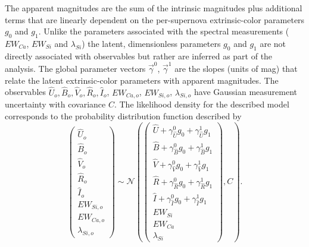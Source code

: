 \documentclass[trackchanges]{aastex61}   	%
\begin{document}
The apparent magnitudes are the sum of the intrinsic magnitudes plus additional terms that are linearly dependent on the
per-supernova
extrinsic-color parameters $g_0$ and $g_1$.  
Unlike the parameters associated with
the spectral measurements ($EW_{Ca}$, $EW_{Si}$ and $\lambda_{Si}$)  the latent,
dimensionless
parameters $g_0$ and $g_1$ are not directly associated
with observables but rather are inferred as part of the analysis.
The global parameter vectors $\vec{\gamma}^0$, $\vec{\gamma}^1$  are the slopes (units of mag) that relate 
the latent extrinsic-color parameters with apparent magnitudes.
The observables
$\hat{U}_o, {\hat{B}}_o, {\hat{V}}_o, {\hat{R}}_o, {\hat{I}}_o$, $EW_{Ca,o}$, $EW_{Si,o}$, $\lambda_{Si,o}$
have Gaussian measurement uncertainty with covariance $C$.
The
likelihood density for the described model
corresponds to the probability distribution function described by
\begin{equation}
\begin{pmatrix}
{\hat{U}}_o\\{\hat{B}}_o\\ {\hat{V}}_o\\{\hat{R}}_o\\{\hat{I}}_o\\EW_{Si, o}\\ EW_{Ca, o} \\ \lambda_{Si, o}
\end{pmatrix}
\sim \mathcal{N}
\left(
\begin{pmatrix}
{\hat{U}} +\gamma^0_{{\hat{U}}} g_0 +\gamma^1_{{\hat{U}}} g_1 \\{\hat{B}} +\gamma^0_{{\hat{B}}} g_0 +\gamma^1_{{\hat{B}}} g_1 \\
{\hat{V}}+\gamma^0_{{\hat{V}}} g_0+\gamma^1_{{\hat{V}}} g_1\\{\hat{R}}+\gamma^0_{{\hat{R}}} g_0 + \gamma^1_{{\hat{R}}} g_1\\{\hat{I}}+\gamma^0_{{\hat{I}}} g_0+\gamma^1_{{\hat{I}}} g_1\\
EW_{Si}\\ EW_{Ca} \\ \lambda_{Si}
\end{pmatrix}
,C
\right).
\label{dust:eqn}
\end{equation}
\end{document}

